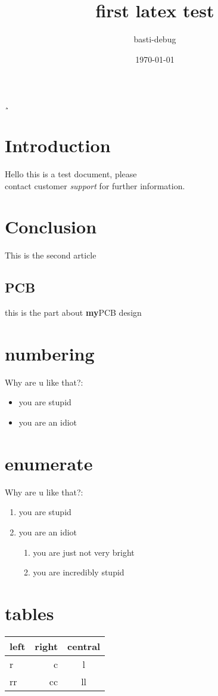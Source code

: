 \documentclass[a4paper,12pt]{scrartcl}
\title{first latex test}
\author{basti-debug}
\date{\today}
\begin{document}
	\maketitle
	\tableofcontents
¸
	\section{Introduction}
	Hello this is a test document, please \\ %
	contact customer \emph{support} for further information. 
	
	\section{Conclusion}
	This is the second article 
	\subsection{PCB}
	this is the part about \textbf{my}PCB design 
	
	\section{numbering}
	Why are u like that?:
	\begin{itemize}
		\item you are stupid
		\item you are an idiot
	\end{itemize}

	\section{enumerate}
	Why are u like that?:
	\begin{enumerate}
		\item you are stupid
		\item you are an idiot
		\begin{enumerate}
			\item you are just not very bright 
			\item you are incredibly stupid
		\end{enumerate}
	\end{enumerate}


	\section{tables}
	\begin{center}
		\begin{tabular}{|l|r|c|}
			left & right & central \\
		\hline
			r & c & l \\
			rr & cc & ll \\
		\end{tabular}
	\end{center}
\end{document}
